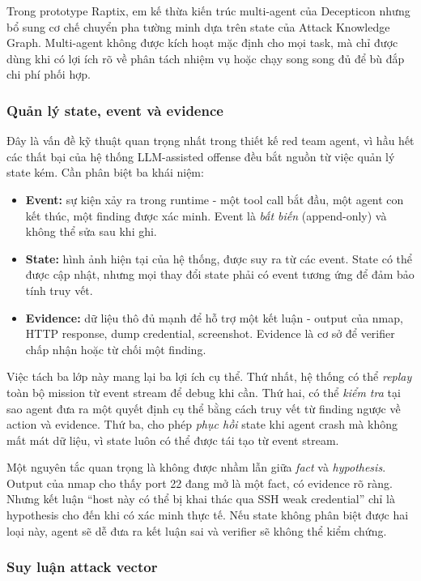 Trong prototype Raptix, em kế thừa kiến trúc multi-agent của Decepticon nhưng bổ sung cơ chế chuyển pha tường minh dựa trên state của Attack Knowledge Graph. Multi-agent không được kích hoạt mặc định cho mọi task, mà chỉ được dùng khi có lợi ích rõ về phân tách nhiệm vụ hoặc chạy song song đủ để bù đắp chi phí phối hợp.

\subsubsection*{Quản lý state, event và evidence}

Đây là vấn đề kỹ thuật quan trọng nhất trong thiết kế red team agent, vì hầu hết các thất bại của hệ thống LLM-assisted offense đều bắt nguồn từ việc quản lý state kém. Cần phân biệt ba khái niệm:

\begin{itemize}
    \item \textbf{Event:} sự kiện xảy ra trong runtime - một tool call bắt đầu, một agent con kết thúc, một finding được xác minh. Event là \emph{bất biến} (append-only) và không thể sửa sau khi ghi.
    \item \textbf{State:} hình ảnh hiện tại của hệ thống, được suy ra từ các event. State có thể được cập nhật, nhưng mọi thay đổi state phải có event tương ứng để đảm bảo tính truy vết.
    \item \textbf{Evidence:} dữ liệu thô đủ mạnh để hỗ trợ một kết luận - output của nmap, HTTP response, dump credential, screenshot. Evidence là cơ sở để verifier chấp nhận hoặc từ chối một finding.
\end{itemize}

Việc tách ba lớp này mang lại ba lợi ích cụ thể. Thứ nhất, hệ thống có thể \emph{replay} toàn bộ mission từ event stream để debug khi cần. Thứ hai, có thể \emph{kiểm tra} tại sao agent đưa ra một quyết định cụ thể bằng cách truy vết từ finding ngược về action và evidence. Thứ ba, cho phép \emph{phục hồi} state khi agent crash mà không mất mát dữ liệu, vì state luôn có thể được tái tạo từ event stream.

Một nguyên tắc quan trọng là không được nhầm lẫn giữa \emph{fact} và \emph{hypothesis}. Output của nmap cho thấy port 22 đang mở là một fact, có evidence rõ ràng. Nhưng kết luận ``host này có thể bị khai thác qua SSH weak credential'' chỉ là hypothesis cho đến khi có xác minh thực tế. Nếu state không phân biệt được hai loại này, agent sẽ dễ đưa ra kết luận sai và verifier sẽ không thể kiểm chứng.

\subsubsection*{Suy luận attack vector}

